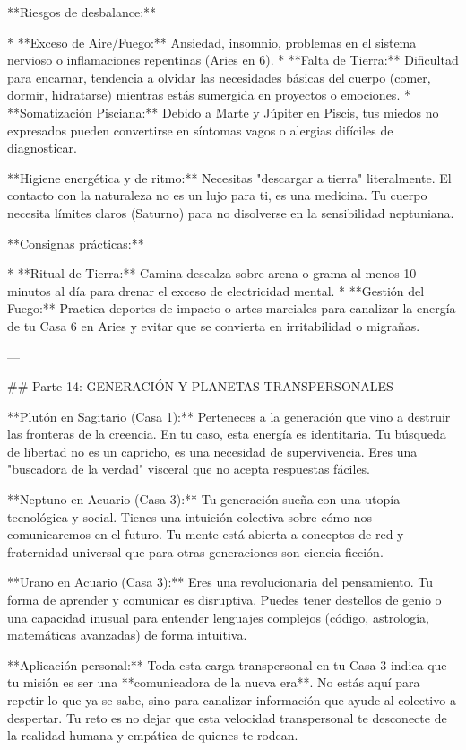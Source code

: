 **Riesgos de desbalance:**

* **Exceso de Aire/Fuego:** Ansiedad, insomnio, problemas en el sistema nervioso o inflamaciones repentinas (Aries en 6).
* **Falta de Tierra:** Dificultad para encarnar, tendencia a olvidar las necesidades básicas del cuerpo (comer, dormir, hidratarse) mientras estás sumergida en proyectos o emociones.
* **Somatización Pisciana:** Debido a Marte y Júpiter en Piscis, tus miedos no expresados pueden convertirse en síntomas vagos o alergias difíciles de diagnosticar.

**Higiene energética y de ritmo:**
Necesitas "descargar a tierra" literalmente. El contacto con la naturaleza no es un lujo para ti, es una medicina. Tu cuerpo necesita límites claros (Saturno) para no disolverse en la sensibilidad neptuniana.

**Consignas prácticas:**

* **Ritual de Tierra:** Camina descalza sobre arena o grama al menos 10 minutos al día para drenar el exceso de electricidad mental.
* **Gestión del Fuego:** Practica deportes de impacto o artes marciales para canalizar la energía de tu Casa 6 en Aries y evitar que se convierta en irritabilidad o migrañas.

---

## Parte 14: GENERACIÓN Y PLANETAS TRANSPERSONALES

**Plutón en Sagitario (Casa 1):**
Perteneces a la generación que vino a destruir las fronteras de la creencia. En tu caso, esta energía es identitaria. Tu búsqueda de libertad no es un capricho, es una necesidad de supervivencia. Eres una "buscadora de la verdad" visceral que no acepta respuestas fáciles.

**Neptuno en Acuario (Casa 3):**
Tu generación sueña con una utopía tecnológica y social. Tienes una intuición colectiva sobre cómo nos comunicaremos en el futuro. Tu mente está abierta a conceptos de red y fraternidad universal que para otras generaciones son ciencia ficción.

**Urano en Acuario (Casa 3):**
Eres una revolucionaria del pensamiento. Tu forma de aprender y comunicar es disruptiva. Puedes tener destellos de genio o una capacidad inusual para entender lenguajes complejos (código, astrología, matemáticas avanzadas) de forma intuitiva.

**Aplicación personal:**
Toda esta carga transpersonal en tu Casa 3 indica que tu misión es ser una **comunicadora de la nueva era**. No estás aquí para repetir lo que ya se sabe, sino para canalizar información que ayude al colectivo a despertar. Tu reto es no dejar que esta velocidad transpersonal te desconecte de la realidad humana y empática de quienes te rodean.

